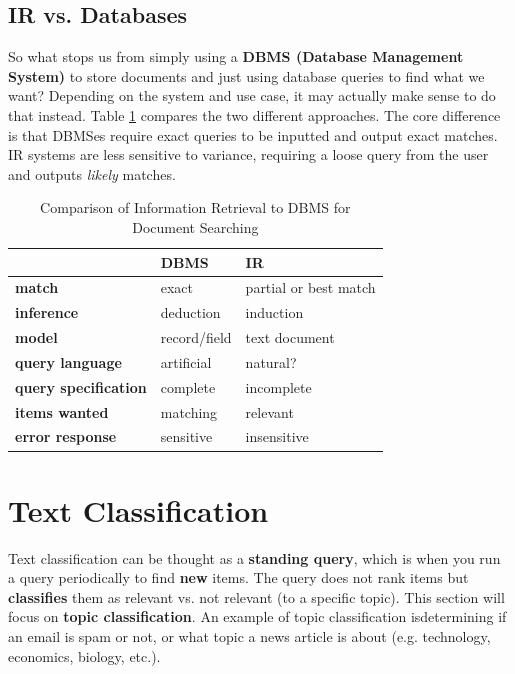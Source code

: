 \documentclass{article}
\begin{document}
\subsection{IR vs. Databases}

So what stops us from simply using a \textbf{DBMS (Database Management System)} to store documents and just using database queries to find what we want? Depending on the system and use case, it may actually make sense to do that instead. Table \ref{tab:ir-db-comparison} compares the two different approaches. The core difference is that DBMSes require exact queries to be inputted and output exact matches. IR systems are less sensitive to variance, requiring a loose query from the user and outputs \textit{likely} matches.
 
\begin{table}
	\centering
	\begin{tabular}{|l|l|l|}
		\hline
		& \textbf{DBMS} & \textbf{IR} \\
		\hline
		\textbf{match} & exact & partial or best match \\
		\textbf{inference} & deduction & induction \\
		\textbf{model} & record/field & text document \\
		\textbf{query language} & artificial & natural? \\
		\textbf{query specification} & complete & incomplete \\
		\textbf{items wanted} & matching & relevant \\
		\textbf{error response} & sensitive & insensitive \\
		\hline
	\end{tabular}
	\caption{Comparison of Information Retrieval to DBMS for Document Searching}
	\label{tab:ir-db-comparison}
\end{table}

\section{Text Classification}

Text classification can be thought as a \textbf{standing query}, which is when you run a query periodically to find \textbf{new} items. The query does not rank items but \textbf{classifies} them as relevant vs. not relevant (to a specific topic). This section will focus on \textbf{topic classification}. An example of topic classification isdetermining if an email is spam or not, or what topic a news article is about (e.g. technology, economics, biology, etc.).
\end{document}
